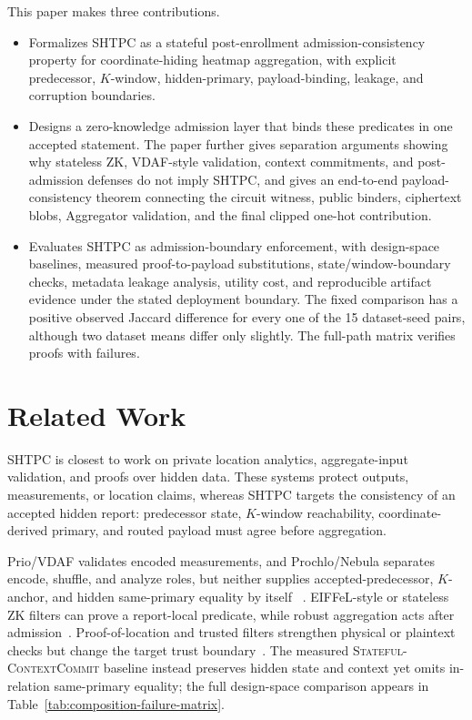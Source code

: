 \documentclass[journal]{IEEEtran}
\theoremstyle{definition}
\theoremstyle{plain}
\begin{document}
This paper makes three contributions.
\begin{itemize}
  \item Formalizes SHTPC as a stateful post-enrollment
    admission-consistency property for coordinate-hiding heatmap aggregation,
    with explicit predecessor, \(K\)-window, hidden-primary, payload-binding,
    leakage, and corruption boundaries.

  \item Designs a zero-knowledge admission layer that binds these predicates in
    one accepted statement. The paper further gives separation arguments showing
    why stateless ZK, VDAF-style validation, context commitments, and
    post-admission defenses do not imply SHTPC, and gives an end-to-end
    payload-consistency theorem connecting the circuit witness, public binders,
    ciphertext blobs, Aggregator validation, and the final clipped one-hot
    contribution.

  \item Evaluates \textsc{SHTPC} as admission-boundary enforcement, with
    design-space baselines, measured proof-to-payload substitutions,
    state/window-boundary checks, metadata leakage analysis, utility cost, and
    reproducible artifact evidence under the stated deployment boundary. The
    fixed comparison has a positive observed Jaccard difference for every one
    of the 15 dataset-seed pairs, although two dataset means differ only
    slightly. The full-path matrix verifies \VFourScaleProofs{} proofs
    with \VFourScaleProofFailures{} failures.
\end{itemize}

\section{Related Work}
\label{sec:related-work}

\textsc{SHTPC} is closest to work on private location analytics, aggregate-input
validation, and proofs over hidden data. These systems protect outputs,
measurements, or location claims, whereas SHTPC targets the consistency of an
accepted hidden report: predecessor state, \(K\)-window reachability,
coordinate-derived primary, and routed payload must agree before aggregation.

Prio/VDAF validates encoded measurements, and Prochlo/Nebula separates encode,
shuffle, and analyze roles, but neither supplies accepted-predecessor,
\(K\)-anchor, and hidden same-primary equality by itself
~\cite{Corrigan2017Prio,Barnes2026VDAF,Bittau2017Prochlo,Shamsabadi2025Nebula}.
EIFFeL-style or stateless ZK filters can prove a report-local predicate, while
robust aggregation acts after admission~\cite{Chowdhury2022EIFFeL,
Blanchard2017Krum,Yin2018Byzantine,Cao2021FLTrust,Nguyen2022FLAME}.
Proof-of-location and trusted filters strengthen physical or plaintext checks
but change the target trust boundary~\cite{Tippenhauer2011GPS}. The measured
\textsc{Stateful-ContextCommit} baseline instead preserves hidden state and
context yet omits in-relation same-primary equality; the full design-space
comparison appears in Table~\ref{tab:composition-failure-matrix}.
\end{document}
